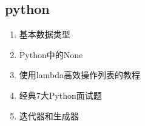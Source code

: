 \documentclass[letterpaper,10pt,english]{sphinxmanual}
\begin{document}
\subsection{python}
\label{\detokenize{else/02_interview:python}}\begin{enumerate}
\item {} 
基本数据类型

\end{enumerate}
\begin{quote}

\end{quote}
\begin{enumerate}
\setcounter{enumi}{1}
\item {} 
Python中的None

\end{enumerate}
\begin{quote}

\end{quote}
\begin{enumerate}
\setcounter{enumi}{2}
\item {} 
使用lambda高效操作列表的教程

\end{enumerate}
\begin{quote}

\end{quote}
\begin{enumerate}
\setcounter{enumi}{3}
\item {} 
经典7大Python面试题

\end{enumerate}
\begin{quote}

\end{quote}
\begin{enumerate}
\setcounter{enumi}{4}
\item {} 
迭代器和生成器

\end{enumerate}
\begin{quote}

\end{quote}
\end{document}
